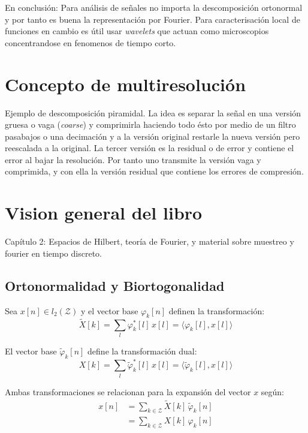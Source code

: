 		En conclusión: Para análisis de señales no importa la descomposición ortonormal y por tanto es buena la representación por Fourier. Para caracterisación local de funciones en cambio es útil usar \emph{wavelets} que actuan como microscopios concentrandose en fenomenos de tiempo corto.
		
	
	\section{Concepto de multiresolución}
		Ejemplo de descomposición piramidal. La idea es separar la señal en una versión gruesa o vaga (\emph{coarse}) y comprimirla haciendo todo ésto por medio de un filtro pasabajos o una decimación y a la versión original restarle la nueva versión pero reescalada a la original. La tercer versión es la residual o de error y contiene el error al bajar la resolución. Por tanto uno transmite la versión vaga y comprimida, y con ella la versión residual que contiene los errores de compresión.

	\section{Vision general del libro}
		
		{\large{Capítulo 2:}} Espacios de Hilbert, teoría de Fourier, y material sobre muestreo y fourier en tiempo discreto. 

	\subsection{Ortonormalidad y Biortogonalidad}
	Sea $x[n] \in l_2(\mathcal{Z})$ y el vector base $\varphi_k[n]$ definen la transformación:
		\begin{equation*}
			\tilde{X}[k] = \sum_{l} \varphi^{*}_k [l] \, x[l] = \langle \varphi_k[l], x[l] \rangle
		\end{equation*}
	
	El vector base $\tilde{\varphi}_k[n]$ define la transformación dual:
		\begin{equation*}
			X[k] = \sum_{l} \tilde{\varphi}^{*}_k [l] \, x[l] = \langle \tilde{\varphi}_k[l], x[l] \rangle
		\end{equation*}

	Ambas transformaciones se relacionan para la expansión del vector $x$ según:
		\begin{align*}
			x[n]	&= \sum_{k\in\mathcal{Z}} \tilde{X}[k] \, \tilde{\varphi}_k[n]\\
				&= \sum_{k\in\mathcal{Z}} X[k] \, \varphi_k [n]
		\end{align*}
	
